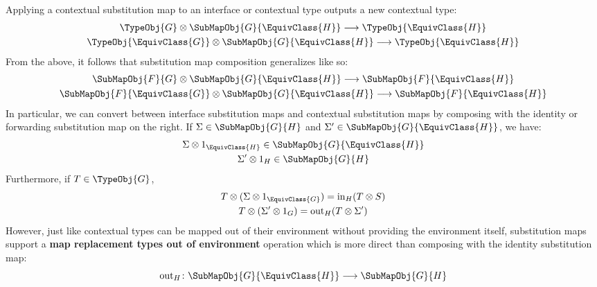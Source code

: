 \documentclass[../generics]{subfiles}
\begin{document}
Applying a contextual substitution map to an interface or contextual type outputs a new contextual type:
\begin{gather*}
\TypeObj{G}\otimes\SubMapObj{G}{\EquivClass{H}}\longrightarrow\TypeObj{\EquivClass{H}}\\
\TypeObj{\EquivClass{G}}\otimes\SubMapObj{G}{\EquivClass{H}}\longrightarrow\TypeObj{\EquivClass{H}}
\end{gather*}
From the above, it follows that substitution map composition generalizes like so:
\begin{gather*}
\SubMapObj{F}{G}\otimes\SubMapObj{G}{\EquivClass{H}}\longrightarrow\SubMapObj{F}{\EquivClass{H}}\\
\SubMapObj{F}{\EquivClass{G}}\otimes\SubMapObj{G}{\EquivClass{H}}\longrightarrow\SubMapObj{F}{\EquivClass{H}}
\end{gather*}
In particular, we can convert between interface substitution maps and contextual substitution maps by composing with the identity or forwarding substitution map on the right. If $\Sigma\in\SubMapObj{G}{H}$ and $\Sigma^\prime\in\SubMapObj{G}{\EquivClass{H}}$, we have:
\begin{gather*}
\Sigma\otimes 1_{\EquivClass{H}}\in\SubMapObj{G}{\EquivClass{H}}\\
\Sigma^\prime\otimes 1_H\in\SubMapObj{G}{H}
\end{gather*}
Furthermore, if $T\in\TypeObj{G}$,
\begin{gather*}
T\otimes (\Sigma\otimes 1_{\EquivClass{G}}) = \mathrm{in}_H(T\otimes S)\\
T\otimes (\Sigma^\prime \otimes 1_G) = \mathrm{out}_H(T\otimes \Sigma^\prime)
\end{gather*}
However, just like contextual types can be mapped out of their environment without providing the environment itself, substitution maps support a \textbf{map replacement types out of environment} operation which is more direct than composing with the identity substitution map:
\[\mathrm{out}_H\colon\SubMapObj{G}{\EquivClass{H}}\longrightarrow\SubMapObj{G}{H}\]
\end{document}
